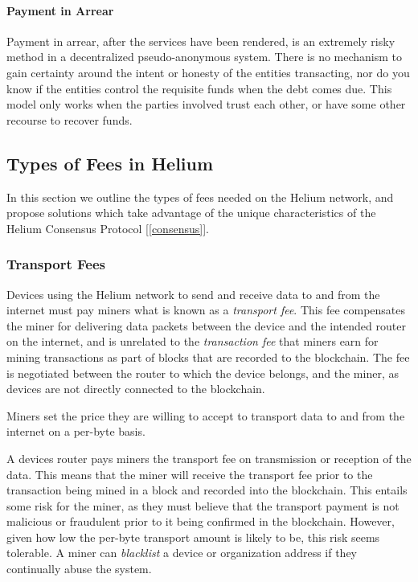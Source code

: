 \documentclass[10pt, nonatbib, nocopyrightspace, reprint]{sigplanconf}
\newcommand{\secref}[1]{[\autoref{#1}]}
\begin{document}
\paragraph{Payment in Arrear}
Payment in arrear, after the services have been rendered, is an extremely risky method in a decentralized pseudo-anonymous system. There is no mechanism to gain certainty around the intent or honesty of the entities transacting, nor do you know if the entities control the requisite funds when the debt comes due. This model only works when the parties involved trust each other, or have some other recourse to recover funds.

\subsection{Types of Fees in Helium}

In this section we outline the types of fees needed on the Helium network, and propose solutions which take advantage of the unique characteristics of the Helium Consensus Protocol \secref{consensus}.

\subsubsection{Transport Fees}

Devices using the Helium network to send and receive data to and from the internet must pay miners what is known as a \emph{transport fee}. This fee compensates the miner for delivering data packets between the device and the intended router on the internet, and is unrelated to the \emph{transaction fee} that miners earn for mining transactions as part of blocks that are recorded to the blockchain. The fee is negotiated between the router to which the device belongs, and the miner, as devices are not directly connected to the blockchain.

Miners set the price they are willing to accept to transport data to and from the internet on a per-byte basis.

A devices router pays miners the transport fee on transmission or reception of the data. This means that the miner will receive the transport fee prior to the transaction being mined in a block and recorded into the blockchain. This entails some risk for the miner, as they must believe that the transport payment is not malicious or fraudulent prior to it being confirmed in the blockchain. However, given how low the per-byte transport amount is likely to be, this risk seems tolerable. A miner can \emph{blacklist} a device or organization address if they continually abuse the system.
\end{document}
